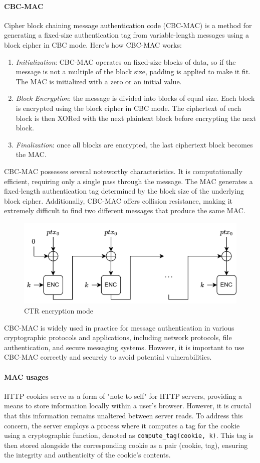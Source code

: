 \paragraph*{CBC-MAC}
Cipher block chaining message authentication code (CBC-MAC) is a method for generating a fixed-size authentication tag from variable-length messages using a block cipher in CBC mode.
Here's how CBC-MAC works:
\begin{enumerate}
    \item \textit{Initialization}: CBC-MAC operates on fixed-size blocks of data, so if the message is not a multiple of the block size, padding is applied to make it fit. 
        The MAC is initialized with a zero or an initial value.
    \item \textit{Block Encryption}: the message is divided into blocks of equal size. 
        Each block is encrypted using the block cipher in CBC mode. 
        The ciphertext of each block is then XORed with the next plaintext block before encrypting the next block.
    \item \textit{Finalization}: once all blocks are encrypted, the last ciphertext block becomes the MAC.
\end{enumerate}
CBC-MAC possesses several noteworthy characteristics. 
It is computationally efficient, requiring only a single pass through the message. 
The MAC generates a fixed-length authentication tag determined by the block size of the underlying block cipher. 
Additionally, CBC-MAC offers collision resistance, making it extremely difficult to find two different messages that produce the same MAC.
\begin{figure}[H]
    \centering
    \includegraphics[width=0.75\linewidth]{images/cbcmac.png}
    \caption{CTR encryption mode}
\end{figure}
CBC-MAC is widely used in practice for message authentication in various cryptographic protocols and applications, including network protocols, file authentication, and secure messaging systems. 
However, it is important to use CBC-MAC correctly and securely to avoid potential vulnerabilities.

\paragraph*{MAC usages}
HTTP cookies serve as a form of "note to self" for HTTP servers, providing a means to store information locally within a user's browser. 
However, it is crucial that this information remains unaltered between server reads. 
To address this concern, the server employs a process where it computes a tag for the cookie using a cryptographic function, denoted as \texttt{compute\_tag(cookie, k)}. 
This tag is then stored alongside the corresponding cookie as a pair (cookie, tag), ensuring the integrity and authenticity of the cookie's contents.

